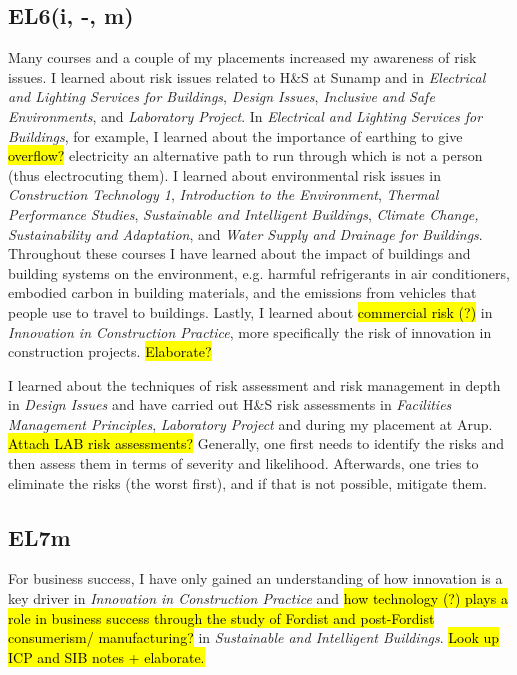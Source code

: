 \subsection*{EL6(i, -, m)}

Many courses and a couple of my placements increased my awareness of risk issues.
I learned about risk issues related to H\&S at Sunamp and in
\textit{Electrical and Lighting Services for Buildings},
\textit{Design Issues},
\textit{Inclusive and Safe Environments},
and
\textit{Laboratory Project}.
In \textit{Electrical and Lighting Services for Buildings}, for example, I learned about the importance of earthing to give \hl{overflow?} electricity an alternative path to run through which is not a person (thus electrocuting them).
I learned about environmental risk issues in
\textit{Construction Technology 1},
\textit{Introduction to the Environment},
\textit{Thermal Performance Studies},
\textit{Sustainable and Intelligent Buildings},
\textit{Climate Change, Sustainability and Adaptation},
and
\textit{Water Supply and Drainage for Buildings}.
Throughout these courses I have learned about the impact of buildings and building systems on the environment, e.g. harmful refrigerants in air conditioners, embodied carbon in building materials, and the emissions from vehicles that people use to travel to buildings.
Lastly, I learned about \hl{commercial risk (?)} in \textit{Innovation in Construction Practice}, more specifically the risk of innovation in construction projects.
\hl{Elaborate?}

I learned about the techniques of risk assessment and risk management in depth in \textit{Design Issues} and have carried out H\&S risk assessments in \textit{Facilities Management Principles}, \textit{Laboratory Project} and during my placement at Arup.
\hl{Attach LAB risk assessments?}
Generally, one first needs to identify the risks and then assess them in terms of severity and likelihood.
Afterwards, one tries to eliminate the risks (the worst first), and if that is not possible, mitigate them.


\subsection*{EL7m}

For business success, I have only gained an understanding of how innovation is a key driver in \textit{Innovation in Construction Practice} and \hl{how technology (?) plays a role in business success through the study of Fordist and post-Fordist consumerism/ manufacturing?} in \textit{Sustainable and Intelligent Buildings}.
\hl{Look up ICP and SIB notes + elaborate.}

